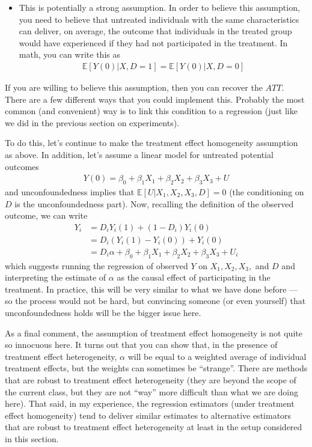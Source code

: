 \documentclass[
  letterpaper,
  DIV=11,
  numbers=noendperiod]{scrreprt}
\providecommand{\tightlist}{%
  \setlength{\itemsep}{0pt}\setlength{\parskip}{0pt}}\usepackage{longtable,booktabs,array}
\begin{document}
\begin{itemize}
\tightlist
\item
  This is potentially a strong assumption. In order to believe this
  assumption, you need to believe that untreated individuals with the
  same characteristics can deliver, on average, the outcome that
  individuals in the treated group would have experienced if they had
  not participated in the treatment. In math, you can write this as
  \begin{align*}
      \mathbb{E}[Y(0) | X, D=1] = \mathbb{E}[Y(0) | X, D=0]
    \end{align*}
\end{itemize}

If you are willing to believe this assumption, then you can recover the
\(ATT\). There are a few different ways that you could implement this.
Probably the most common (and convenient) way is to link this condition
to a regression (just like we did in the previous section on
experiments).

To do this, let's continue to make the treatment effect homogeneity
assumption as above. In addition, let's assume a linear model for
untreated potential outcomes \begin{align*}
  Y(0) = \beta_0 + \beta_1 X_1 + \beta_2 X_2 + \beta_3 X_3 + U
\end{align*} and unconfoundedness implies that
\(\mathbb{E}[U|X_1,X_2,X_3,D] = 0\) (the conditioning on \(D\) is the
unconfoundedness part). Now, recalling the definition of the observed
outcome, we can write \begin{align*}
  Y_i &= D_i Y_i(1) + (1-D_i) Y_i(0) \\
  &= D_i (Y_i(1) - Y_i(0)) + Y_i(0) \\
  &= D_i \alpha + \beta_0 + \beta_1 X_1 + \beta_2 X_2 + \beta_3 X_3 + U_i
\end{align*} which suggests running the regression of observed \(Y\) on
\(X_1,X_2,X_3,\) and \(D\) and interpreting the estimate of \(\alpha\)
as the causal effect of participating in the treatment. In practice,
this will be very similar to what we have done before --- so the process
would not be hard, but convincing someone (or even yourself) that
unconfoundedness holds will be the bigger issue here.

As a final comment, the assumption of treatment effect homogeneity is
not quite so innocuous here. It turns out that you can show that, in the
presence of treatment effect heterogeneity, \(\alpha\) will be equal to
a weighted average of individual treatment effects, but the weights can
sometimes be ``strange''. There are methods that are robust to treatment
effect heterogeneity (they are beyond the scope of the current class,
but they are not ``way'' more difficult than what we are doing here).
That said, in my experience, the regression estimators (under treatment
effect homogeneity) tend to deliver similar estimates to alternative
estimators that are robust to treatment effect heterogeneity at least in
the setup considered in this section.
\end{document}
